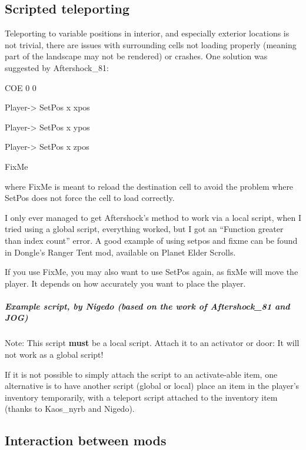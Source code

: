 \hypertarget{scripted-teleporting}{%
\subsection{Scripted teleporting}\label{scripted-teleporting}}

Teleporting to variable positions in interior, and especially exterior
locations is not trivial, there are issues with surrounding cells not
loading properly (meaning part of the landscape may not be rendered) or
crashes. One solution was suggested by Aftershock\_81:

COE 0 0

Player-> SetPos x xpos

Player-> SetPos x ypos

Player-> SetPos x zpos

FixMe

where FixMe is meant to reload the destination cell to avoid the problem
where SetPos does not force the cell to load correctly.

I only ever managed to get Aftershock's method to work via a local
script, when I tried using a global script, everything worked, but I got
an ``Function greater than index count'' error. A good example of using
setpos and fixme can be found in Dongle's Ranger Tent mod, available on
Planet Elder Scrolls.

If you use FixMe, you may also want to use SetPos again, as fixMe will
move the player. It depends on how accurately you want to place the
player.

\hypertarget{example-script-by-nigedo-based-on-the-work-of-aftershock_81-and-jog}{%
\subparagraph{Example script, by Nigedo (based on the work of
Aftershock\_81 and
JOG)}\label{example-script-by-nigedo-based-on-the-work-of-aftershock_81-and-jog}}

Note: This script \textbf{must} be a local script. Attach it to an
activator or door: It will not work as a global script!



If it is not possible to simply attach the script to an activate-able
item, one alternative is to have another script (global or local) place
an item in the player's inventory temporarily, with a teleport script
attached to the inventory item (thanks to Kaos\_nyrb and Nigedo).

\hypertarget{interaction-between-mods}{%
\subsection{\texorpdfstring{\hfill\break
Interaction between
mods}{ Interaction between mods}}\label{interaction-between-mods}}

